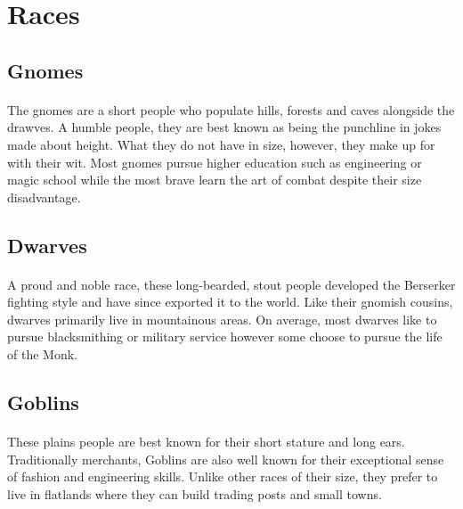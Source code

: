 \pagebreak

\section{Races}

\subsection{Gnomes}

\paragraph{} The gnomes are a short people who populate hills, forests and caves alongside the drawves. A humble people, they are best known as being the punchline in jokes made about height. What they do not have in size, however, they make up for with their wit. Most gnomes pursue higher education such as engineering or magic school while the most brave learn the art of combat despite their size disadvantage.

\subsection{Dwarves}

\paragraph{} A proud and noble race, these long-bearded, stout people developed the Berserker fighting style and have since exported it to the world. Like their gnomish cousins, dwarves primarily live in mountainous areas. On average, most dwarves like to pursue blacksmithing or military service however some choose to pursue the life of the Monk.

\subsection{Goblins}

\paragraph{} These plains people are best known for their short stature and long ears. Traditionally merchants, Goblins are also well known for their exceptional sense of fashion and engineering skills. Unlike other races of their size, they prefer to live in flatlands where they can build trading posts and small towns.

